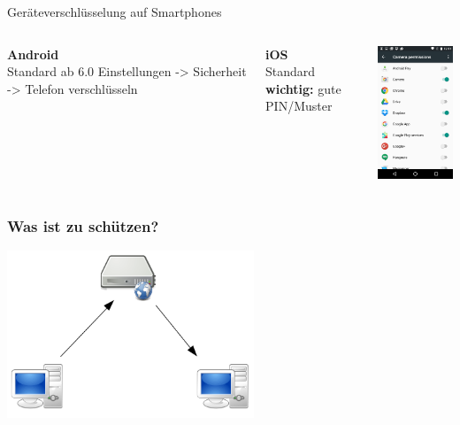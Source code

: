 \documentclass[12pt, xcolor={svgnames,table}]{beamer}
\begin{document}
\begin{frame}{Geräteverschlüsselung auf Smartphones}
  \begin{columns}
    \column{5.5cm}
    \footnotesize

    \textbf{Android}\\
    Standard ab 6.0
    Einstellungen -> Sicherheit -> Telefon verschlüsseln\\
    \vspace{0.5cm}

    \textbf{iOS}\\
    Standard\\
    \vspace{0.5cm}
    \textbf{wichtig:} gute PIN/Muster

    \column{5cm}

    \begin{center}
      \includegraphics[width=3.5cm]{img/permissions-android.png}
    \par\end{center}
  \end{columns}
\end{frame}

\begin{frame}
    \frametitle{Was ist zu schützen?}
    \begin{center}
      \includegraphics[height=5cm]{img/c-s.png}
    \end{center}
\end{frame}
\end{document}
